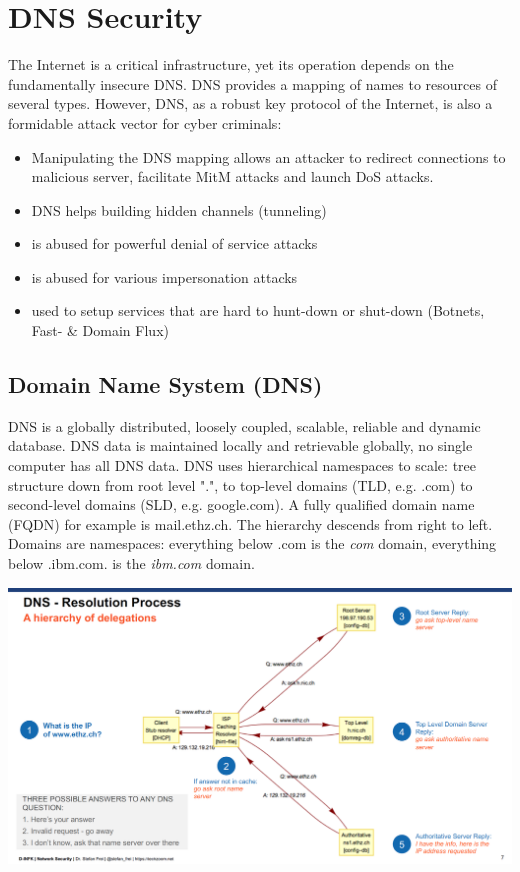 \section{DNS Security}

The Internet is a critical infrastructure, yet its operation depends on the fundamentally insecure DNS. DNS provides a mapping of names to resources of several types. However, DNS, as a robust key protocol of the Internet, is also a formidable attack vector for cyber criminals:

\begin{itemize}
	\item Manipulating the DNS mapping allows an attacker to redirect connections to malicious server, facilitate MitM attacks and launch DoS attacks.
	\item DNS helps building hidden channels (tunneling)
	\item is abused for powerful denial of service attacks
	\item is abused for various impersonation attacks
	\item used to setup services that are hard to hunt-down or shut-down (Botnets, Fast- & Domain Flux)
\end{itemize}

\subsection{Domain Name System (DNS)}
DNS is a globally distributed, loosely coupled, scalable, reliable and dynamic database. DNS data is maintained locally and retrievable globally, no single computer has all DNS data. 
DNS uses hierarchical namespaces to scale: tree structure down from root level ".", to top-level domains (TLD, e.g. .com) to second-level domains (SLD, e.g. google.com). A fully qualified domain name (FQDN) for example is mail.ethz.ch. The hierarchy descends from right to left. Domains are namespaces: everything below .com is the \textit{com} domain, everything below .ibm.com. is the \textit{ibm.com} domain.

\begin{minipage}{\linewidth}
    \centering      
    \includegraphics[width=\linewidth]{Figures/DNS_resolution.PNG} 
\end{minipage}

